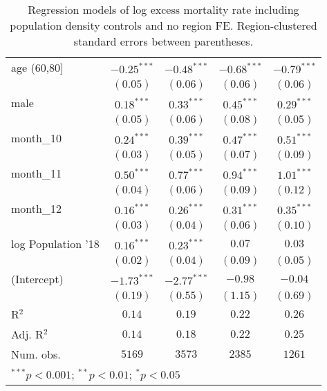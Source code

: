 \begin{table}[h!]
\begin{center}
\begin{small}
\begin{tabular}{l c c c c}
age (60,80]        & $-0.25^{***}$ & $-0.48^{***}$ & $-0.68^{***}$ & $-0.79^{***}$ \\
                   & $(0.05)$      & $(0.06)$      & $(0.06)$      & $(0.06)$      \\
male               & $0.18^{***}$  & $0.33^{***}$  & $0.45^{***}$  & $0.29^{***}$  \\
                   & $(0.05)$      & $(0.06)$      & $(0.08)$      & $(0.05)$      \\
month\_10          & $0.24^{***}$  & $0.39^{***}$  & $0.47^{***}$  & $0.51^{***}$  \\
                   & $(0.03)$      & $(0.05)$      & $(0.07)$      & $(0.09)$      \\
month\_11          & $0.50^{***}$  & $0.77^{***}$  & $0.94^{***}$  & $1.01^{***}$  \\
                   & $(0.04)$      & $(0.06)$      & $(0.09)$      & $(0.12)$      \\
month\_12          & $0.16^{***}$  & $0.26^{***}$  & $0.31^{***}$  & $0.35^{***}$  \\
                   & $(0.03)$      & $(0.04)$      & $(0.06)$      & $(0.10)$      \\
log Population '18 & $0.16^{***}$  & $0.23^{***}$  & $0.07$        & $0.03$        \\
                   & $(0.02)$      & $(0.04)$      & $(0.09)$      & $(0.05)$      \\
(Intercept)        & $-1.73^{***}$ & $-2.77^{***}$ & $-0.98$       & $-0.04$       \\
                   & $(0.19)$      & $(0.55)$      & $(1.15)$      & $(0.69)$      \\
\hline
R$^2$              & $0.14$        & $0.19$        & $0.22$        & $0.26$        \\
Adj. R$^2$         & $0.14$        & $0.18$        & $0.22$        & $0.25$        \\
Num. obs.          & $5169$        & $3573$        & $2385$        & $1261$        \\
\hline
\multicolumn{5}{l}{\tiny{$^{***}p<0.001$; $^{**}p<0.01$; $^{*}p<0.05$}}
\end{tabular}
\end{small}
\caption{Regression models of log excess mortality rate including population density controls and no region FE. Region-clustered standard errors between parentheses.}
\label{tab:popdensmodels}
\end{center}
\end{table}
